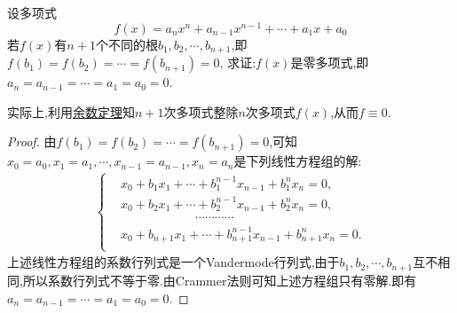 \documentclass[../../main.tex]{subfiles}%
\begin{document}
\begin{proposition}\label{proposition:多项式根的有限性}
设多项式
\[
f(x)=a_nx^n + a_{n - 1}x^{n - 1}+\cdots+a_1x + a_0
\]
若\(f(x)\)有\(n + 1\)个不同的根\(b_1,b_2,\cdots,b_{n+1}\),即\(f(b_1)=f(b_2)=\cdots=f(b_{n+1})=0\),
求证:\(f(x)\)是零多项式,即\(a_n=a_{n - 1}=\cdots=a_1=a_0 = 0\).
\end{proposition}
\begin{remark}
实际上,利用\hyperref[theorem:余数定理]{余数定理}知$n+1$次多项式整除$n$次多项式$f(x)$,从而$f\equiv 0$.
\end{remark}
\begin{proof}
由\(f(b_1)=f(b_2)=\cdots=f(b_{n+1})=0\),可知$x_0=a_0,x_1=a_1,\cdots ,x_{n-1}=a_{n-1},x_n=a_n$是下列线性方程组的解:
\begin{align*}
\left\{ \begin{aligned}
&x_0+b_1x_1+\cdots +b_{1}^{n-1}x_{n-1}+b_{1}^{n}x_n=0,\\
&x_0+b_2x_1+\cdots +b_{2}^{n-1}x_{n-1}+b_{2}^{n}x_n=0,\\
&\qquad \qquad \qquad \cdots \cdots \cdots \cdots\\
&x_0+b_{n+1}x_1+\cdots +b_{n+1}^{n-1}x_{n-1}+b_{n+1}^{n}x_n=0.\\
\end{aligned} \right. 
\end{align*}
上述线性方程组的系数行列式是一个Vandermode行列式,由于$b_1,b_2,\cdots,b_{n+1}$互不相同,所以系数行列式不等于零.由Crammer法则可知上述方程组只有零解.即有$a_n=a_{n - 1}=\cdots=a_1=a_0 = 0$.
\end{proof}
\end{document}
